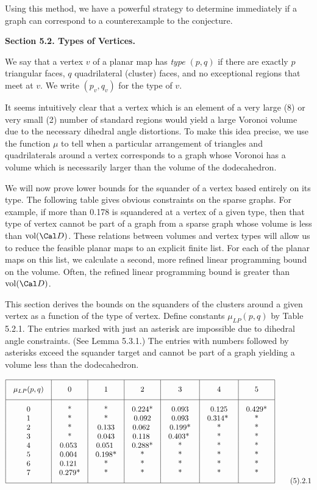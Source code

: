 Using this method, we have a powerful strategy to determine immediately if a graph 
can correspond to a counterexample to the conjecture.  

\bigskip

{\bf Section 5.2. Types of Vertices.}

\bigskip 

We say that a vertex $v$ of a planar map has {\it type} $(p,q)$ if there are exactly $p$ triangular faces, $q$ quadrilateral (cluster) faces, and no exceptional regions that meet at $v$.  We write $(p_v,q_v)$ for the type of $v$.  


It seems intuitively clear that a vertex which is an element of a very large 
(8) or very small (2) number of standard regions would yield a large Voronoi volume due to the necessary dihedral angle distortions.  To make this idea precise, we use the function $\mu$ to tell when a particular arrangement of triangles and quadrilaterals around a vertex corresponds to a graph whose Voronoi has a volume which is necessarily larger than the volume of the dodecahedron.  

We will now prove lower bounds for the squander of a vertex based entirely on its type.  The following table gives obvious constraints on the sparse graphs.  For example, if more than 0.178 is squandered at a vertex of a given type, then that type of vertex cannot be part of a graph from a sparse graph whose volume is less than $\vol(\Cal D)$.  These relations between volumes and vertex types will allow us to reduce the feasible planar maps to an explicit finite list.  For each of the planar maps on this list, we calculate a second, more refined linear programming bound on the volume.  Often, the refined linear programming bound is greater than $\vol(\Cal D)$.  

This section derives the bounds on the squanders of the clusters around a given vertex as a function of the type of vertex.  Define constants $\mu_{LP} (p,q)$ by Table 5.2.1.  The entries marked with just an asterisk are impossible due to dihedral angle constraints.  
(See Lemma 5.3.1.)
The entries with numbers followed by asterisks exceed  the squander target and cannot be part of a graph yielding a volume less than the dodecahedron.


$$
\vbox{\offinterlineskip
\hrule
\halign{&\vrule#&\strut\quad\hfil#\hfil\quad\cr
height 7pt&\omit&&\omit&&\omit&&\omit&&\omit&&\omit&&\omit&\cr
&\hfil $\mu_{LP} (p,q)$\hfil
        &&\hfil0\hfil
        &&\hfil1\hfil
        &&\hfil2\hfil
        &&\hfil3\hfil
        &&\hfil4\hfil
        &&\hfil5\hfil&
\cr
height 7pt&\omit&&\omit&&\omit&&\omit&&\omit&&\omit&&\omit&\cr
\noalign{\hrule}
height7pt&\omit&&\omit&&\omit&&\omit&&\omit&&\omit&&\omit&\cr
&0&&	*&&	*&&	0.224*&&  0.093&& 0.125&& 0.429*&\cr
&1&&	*&& *&&  0.092&& 0.093&& 0.314* && *&\cr
&2&&	*&& 0.133&& 0.062 && 0.199*&& *&&*&\cr
&3&&	*&& 0.043&& 0.118 && 0.403* &&*&&*&\cr
&4&& 0.053 && 0.051 && 0.288*&&*&&*&&*&\cr
&5&& 0.004 && 0.198*&&*&&*&&*&&*&\cr
&6&& 0.121 &&*&&*&&*&&*&&*&\cr
&7&& 0.279*&&*&&*&&*&&*&&*&\cr
height7pt&\omit&&\omit&&\omit&&\omit&&\omit&&\omit&&\omit&\cr}
\hrule
}\tag 5.2.1
$$


